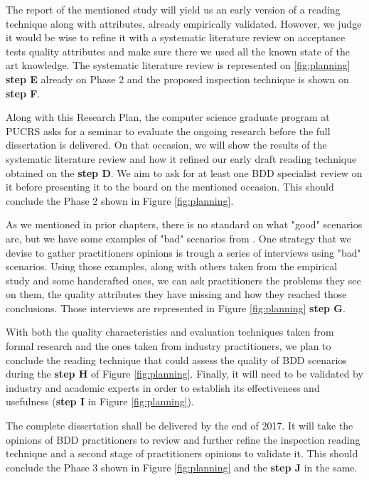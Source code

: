 The report of the mentioned study will yield us an early version of a reading technique along with attributes, already empirically validated. However, we judge it would be wise to refine it with a systematic literature review on acceptance tests quality attributes and make sure there we used all the known state of the art knowledge. The systematic literature review is represented on \ref{fig:planning} \textbf{step E} already on Phase 2 and the proposed inspection technique is shown on \textbf{step F}.

Along with this Research Plan, the computer science graduate program at PUCRS asks for a seminar to evaluate the ongoing research before the full dissertation is delivered. On that occasion, we will show the results of the systematic literature review and how it refined our early draft reading technique obtained on the \textbf{step D}. We aim to ask for at least one BDD specialist review on it before presenting it to the board on the mentioned occasion. This should conclude the Phase 2 shown in Figure \ref{fig:planning}.

As we mentioned in prior chapters, there is no standard on what "good" scenarios are, but we have some examples of "bad" scenarios from \cite{Smart_2014}. One strategy that we devise to gather practitioners opinions is trough a series of interviews using "bad" scenarios. Using those examples, along with others taken from the empirical study and some handcrafted ones, we can ask practitioners the problems they see on them, the quality attributes they have missing and how they reached those conclusions. Those interviews are represented in Figure \ref{fig:planning} \textbf{step G}.

With both the quality characteristics and evaluation techniques taken from formal research and the ones taken from industry practitioners, we plan to conclude the reading technique that could assess the quality of BDD scenarios during the \textbf{step H} of Figure \ref{fig:planning}. Finally, it will need to be validated by industry and academic experts in order to establish its effectiveness and usefulness (\textbf{step I} in Figure \ref{fig:planning}).

The complete dissertation shall be delivered by the end of 2017. It will take the opinions of BDD practitioners to review and further refine the inspection reading technique and a second stage of practitioners opinions to validate it. This should conclude the Phase 3 shown in Figure \ref{fig:planning} and the \textbf{step J} in the same.

